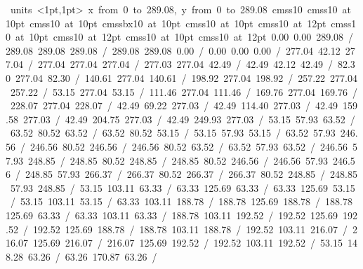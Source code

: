 \hbox{\beginpicture
\setcoordinatesystem units <1pt,1pt>
\setplotarea x from 0 to 289.08, y from 0 to 289.08
\setlinear
\font\picfont cmss10\picfont
\font\picfont cmss10 at 10pt\picfont
\font\picfont cmss10 at 10pt\picfont
\font\picfont cmssbx10 at 10pt\picfont
\font\picfont cmss10 at 10pt\picfont
\font\picfont cmss10 at 12pt\picfont
\font\picfont cmss10 at 10pt\picfont
\font\picfont cmss10 at 12pt\picfont
\font\picfont cmss10 at 10pt\picfont
\font\picfont cmss10 at 12pt\picfont
\setsolid
{} 0.00 0.00 289.08 /
 289.08 289.08 289.08 /
 289.08 289.08 0.00 /
 0.00 0.00 0.00 /
\setsolid
{} 277.04 42.12 277.04 /
 277.04 277.04 277.04 /
 277.03 277.04 42.49 /
 42.49 42.12 42.49 /
\setsolid
{} 82.30 277.04 82.30 /
\setsolid
{} 140.61 277.04 140.61 /
\setsolid
{} 198.92 277.04 198.92 /
\setsolid
{} 257.22 277.04 257.22 /
\setsolid
{} 53.15 277.04 53.15 /
\setsolid
{} 111.46 277.04 111.46 /
\setsolid
{} 169.76 277.04 169.76 /
\setsolid
{} 228.07 277.04 228.07 /
\setsolid
{} 42.49 69.22 277.03 /
\setsolid
{} 42.49 114.40 277.03 /
\setsolid
{} 42.49 159.58 277.03 /
\setsolid
{} 42.49 204.75 277.03 /
\setsolid
{} 42.49 249.93 277.03 /
\setsolid
{} 53.15 57.93 63.52 /
 63.52 80.52 63.52 /
 63.52 80.52 53.15 /
 53.15 57.93 53.15 /
\setsolid
{} 63.52 57.93 246.56 /
 246.56 80.52 246.56 /
 246.56 80.52 63.52 /
 63.52 57.93 63.52 /
\setsolid
{} 246.56 57.93 248.85 /
 248.85 80.52 248.85 /
 248.85 80.52 246.56 /
 246.56 57.93 246.56 /
\setsolid
{} 248.85 57.93 266.37 /
 266.37 80.52 266.37 /
 266.37 80.52 248.85 /
 248.85 57.93 248.85 /
\setsolid
{} 53.15 103.11 63.33 /
 63.33 125.69 63.33 /
 63.33 125.69 53.15 /
 53.15 103.11 53.15 /
\setsolid
{} 63.33 103.11 188.78 /
 188.78 125.69 188.78 /
 188.78 125.69 63.33 /
 63.33 103.11 63.33 /
\setsolid
{} 188.78 103.11 192.52 /
 192.52 125.69 192.52 /
 192.52 125.69 188.78 /
 188.78 103.11 188.78 /
\setsolid
{} 192.52 103.11 216.07 /
 216.07 125.69 216.07 /
 216.07 125.69 192.52 /
 192.52 103.11 192.52 /
\setsolid
{} 53.15 148.28 63.26 /
 63.26 170.87 63.26 /
}
